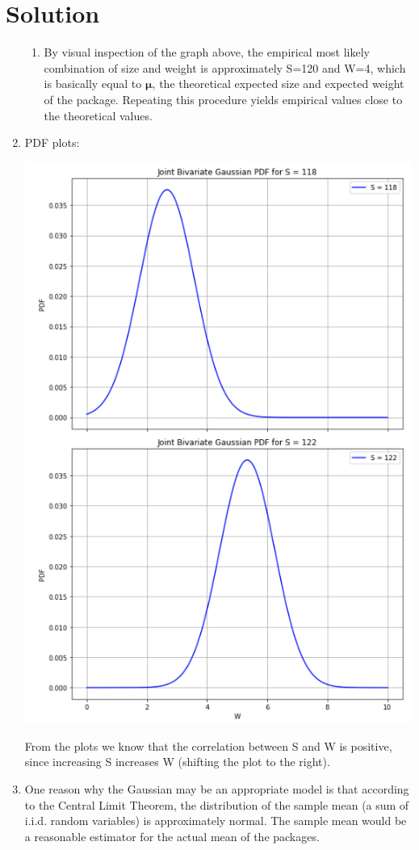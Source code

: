 \documentclass{harvardml}
\theoremstyle{definition}
\theoremstyle{plain}
\newenvironment{solution}
  {\color{blue}\section*{Solution}}
{}
\begin{document}
\begin{solution}
\begin{enumerate}
\begin{enumerate}
    \item By visual inspection of the graph above, the empirical most likely combination of size and weight is approximately S=120 and W=4, which is basically equal to $\boldsymbol{\mu}$, the theoretical expected size and expected weight of the package. Repeating this procedure yields empirical values close to the theoretical values. 
    \end{enumerate}
    \item PDF plots: \begin{center}
        \includegraphics[scale=0.45]{3.2.png}
    \end{center} From the plots we know that the correlation between S and W is positive, since increasing S increases W (shifting the plot to the right).  
    \item One reason why the Gaussian may be an appropriate model is that according to the Central Limit Theorem, the distribution of the sample mean (a sum of i.i.d. random variables) is approximately normal. The sample mean would be a reasonable estimator for the actual mean of the packages. 


\end{enumerate}
\end{solution}
\end{document}
